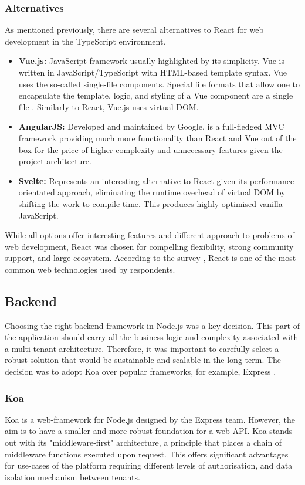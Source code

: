 \subsubsection{Alternatives}
As mentioned previously, there are several alternatives to React for web development in the TypeScript environment.
\begin{itemize}
    \item \textbf{Vue.js:} JavaScript framework usually highlighted by its simplicity. Vue is written in JavaScript/TypeScript with HTML-based template syntax. Vue uses the so-called single-file components. Special file formats that allow one to encapsulate the template, logic, and styling of a Vue component are a single file \cite{vue-docs}. Similarly to React, Vue.js uses virtual \ac{DOM}.
    \item \textbf{AngularJS:} Developed and maintained by Google, is a full-fledged \ac{MVC} framework providing much more functionality than React and Vue out of the box for the price of higher complexity and unnecessary features given the project architecture.
    \item \textbf{Svelte:} Represents an interesting alternative to React given its performance orientated approach, eliminating the runtime overhead of virtual \ac{DOM} by shifting the work to compile time. This produces highly optimised vanilla JavaScript. 
\end{itemize}

While all options offer interesting features and different approach to problems of web development, React was chosen for compelling flexibility, strong community support, and large ecosystem.
According to the survey \cite{StackOverflow2023}, React is one of the most common web technologies used by respondents.

\subsection{Backend}
\label{subsec:backend}
Choosing the right backend framework in Node.js was a key decision.
This part of the application should carry all the business logic and complexity associated with a multi-tenant architecture.
Therefore, it was important to carefully select a robust solution that would be sustainable and scalable in the long term.
The decision was to adopt Koa over popular frameworks, for example, Express \cite{express-docs}.

\subsubsection{Koa}
Koa \cite{koajs-docs} is a web-framework for Node.js designed by the Express team.
However, the aim is to have a smaller and more robust foundation for a web API.
Koa stands out with its "middleware-first" architecture, a principle that places a chain of middleware functions executed upon request.
This offers significant advantages for use-cases of the platform requiring different levels of authorisation, and data isolation mechanism between tenants.

